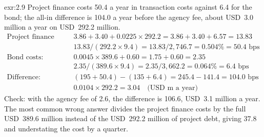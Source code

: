 \begin{solution}{exr:2.9}
Project finance costs 50.4\bps{} a year in transaction costs against 6.4\bps{} for the bond; the all-in difference is 104.0\bps{} a year before the agency fee, about USD~3.0 million a year on USD~292.2 million.
\begin{align*}
\text{Project finance costs:}\quad & 3.86 + 3.40 + 0.0225 \times 292.2 = 3.86 + 3.40 + 6.57 = 13.83\\
& 13.83/(292.2 \times 9.4) = 13.83/2{,}746.7 = 0.504\% = 50.4\text{ bps}\\
\text{Bond costs:}\quad & 0.0045 \times 389.6 + 0.60 = 1.75 + 0.60 = 2.35\\
& 2.35/(389.6 \times 9.4) = 2.35/3{,}662.2 = 0.064\% = 6.4\text{ bps}\\
\text{Difference:}\quad & (195 + 50.4) - (135 + 6.4) = 245.4 - 141.4 = 104.0\text{ bps}\\
& 0.0104 \times 292.2 = 3.04 \quad \text{(USD m a year)}
\end{align*}
Check: with the agency fee of 2.6\bps, the difference is 106.6\bps, USD~3.1 million a year. The most common wrong answer divides the project finance costs by the full USD~389.6 million instead of the USD~292.2 million of project debt, giving 37.8\bps{} and understating the cost by a quarter.
\end{solution}

